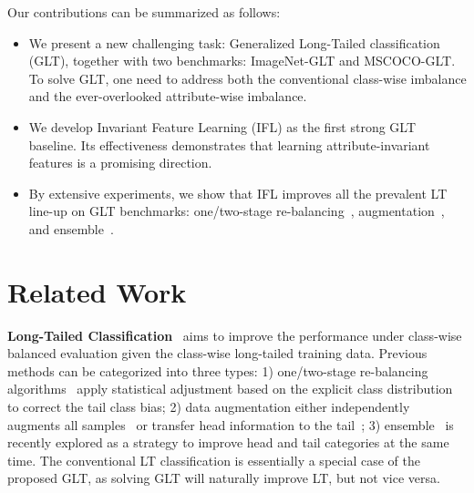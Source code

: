 \documentclass{article}
\begin{document}
Our contributions can be summarized as follows:
\begin{itemize}[leftmargin=1.2em]
\setlength\itemsep{0em}
\item We present a new challenging task: Generalized Long-Tailed classification (GLT), together with two benchmarks: ImageNet-GLT and MSCOCO-GLT. To solve GLT, one need to address both the conventional class-wise imbalance and the ever-overlooked attribute-wise imbalance.
\item We develop Invariant Feature Learning (IFL) as the first strong GLT baseline. Its effectiveness demonstrates that learning attribute-invariant features is a promising direction.
\item By extensive experiments, we show that IFL improves all the prevalent LT line-up on GLT benchmarks: one/two-stage re-balancing~\cite{kang2019decoupling,tang2020long,ren2020balanced,menon2020long,zhou2019bbn,cao2019ldam}, augmentation~\cite{zhang2018mixup,cubuk2020randaugment}, and ensemble~\cite{wang2020long,zhang2021test}.
\end{itemize}



 
\section{Related Work}
\label{sec:2}

\noindent\textbf{Long-Tailed Classification}~\cite{zhu2022cross,liu2019large,cui2019class,zhang2021deep} aims to improve the performance under class-wise balanced evaluation given the class-wise long-tailed training data. Previous methods can be categorized into three types: 1) one/two-stage re-balancing algorithms~\cite{kang2019decoupling,hu2020learning,tan2021equalization,li2020overcoming,tan2020equalization,wang2020devil,hong2021disentangling} apply statistical adjustment based on the explicit class distribution to correct the tail class bias; 2) data augmentation either independently augments all samples~\cite{yin2019feature,kim2020m2m,zhang2018mixup,cubuk2020randaugment} or transfer head information to the tail~\cite{liu2020deep,he2021distilling,li2021self,wang2017learning}; 3) ensemble~\cite{wang2020long,cai2021ace,xiang2020learning,zhang2021test} is recently explored as a strategy to improve head and tail categories at the same time. The conventional LT classification is essentially a special case of the proposed GLT, as solving GLT will naturally improve LT, but not vice versa. 
\end{document}
